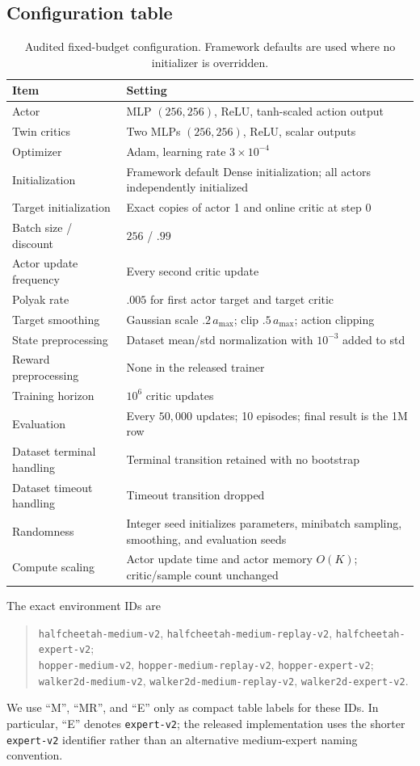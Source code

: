 \documentclass[letterpaper]{article}
\begin{document}
\subsection{Configuration table}
\begin{table}[h]
\caption{Audited fixed-budget configuration. Framework defaults are used where no initializer is overridden.}
\centering
\small
\begin{tabular}{ll}
\toprule
Item & Setting\\
\midrule
Actor & MLP $(256,256)$, ReLU, tanh-scaled action output\\
Twin critics & Two MLPs $(256,256)$, ReLU, scalar outputs\\
Optimizer & Adam, learning rate $3\times10^{-4}$\\
Initialization & Framework default Dense initialization; all actors independently initialized\\
Target initialization & Exact copies of actor 1 and online critic at step 0\\
Batch size / discount & $256$ / $.99$\\
Actor update frequency & Every second critic update\\
Polyak rate & $.005$ for first actor target and target critic\\
Target smoothing & Gaussian scale $.2\,a_{\max}$; clip $.5\,a_{\max}$; action clipping\\
State preprocessing & Dataset mean/std normalization with $10^{-3}$ added to std\\
Reward preprocessing & None in the released trainer\\
Training horizon & $10^6$ critic updates\\
Evaluation & Every $50{,}000$ updates; 10 episodes; final result is the 1M row\\
Dataset terminal handling & Terminal transition retained with no bootstrap\\
Dataset timeout handling & Timeout transition dropped\\
Randomness & Integer seed initializes parameters, minibatch sampling, smoothing, and evaluation seeds\\
Compute scaling & Actor update time and actor memory $O(K)$; critic/sample count unchanged\\
\bottomrule
\end{tabular}
\label{tab:config}
\end{table}

The exact environment IDs are
\begin{quote}\small
\texttt{halfcheetah-medium-v2}, \texttt{halfcheetah-medium-replay-v2}, \texttt{halfcheetah-expert-v2};\\
\texttt{hopper-medium-v2}, \texttt{hopper-medium-replay-v2}, \texttt{hopper-expert-v2};\\
\texttt{walker2d-medium-v2}, \texttt{walker2d-medium-replay-v2}, \texttt{walker2d-expert-v2}.
\end{quote}
We use ``M'', ``MR'', and ``E'' only as compact table labels for these IDs. In particular, ``E'' denotes \texttt{expert-v2}; the released implementation uses the shorter \texttt{expert-v2} identifier rather than an alternative medium-expert naming convention.
\end{document}
